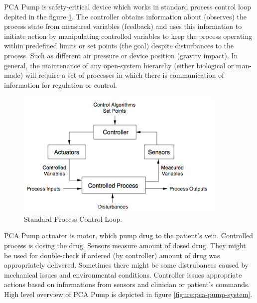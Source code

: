 PCA Pump is safety-critical device which works in standard process control loop depited in the figure \ref{figure:control-loop}. The controller obtains information about (observes) the process state from measured variables (feedback) and uses this information to initiate action by manipulating controlled variables to keep the process operating within predefined limits or set points (the goal) despite disturbances to the process. Such as different air pressure or device position (gravity impact). In general, the maintenance of any open-system hierarchy (either biological or man-made) will require a set of processes in which there is communication of information for regulation or control. \cite{SaferWorld} 

\begin{figure}[ht]%
    \begin{center}
    	\includegraphics[width=0.9\textwidth]{figures/safety-critical-loop.png}    	
    \end{center}
    \caption{Standard Process Control Loop.}
    \label{figure:control-loop}
\end{figure}

PCA Pump actuator is motor, which pump drug to the patient's vein. Controlled process is dosing the drug. Sensors measure amount of dosed drug. They might be used for double-check if ordered (by controller) amount of drug was appropriately delivered. Sometimes there might be some distrubances caused by mechanical issues and environmental conditions. Controller issues appropriate actions based on informations from sensors and clinician or patient's commands. High level overview of PCA Pump is depicted in figure \ref{figure:pca-pump-system}.

